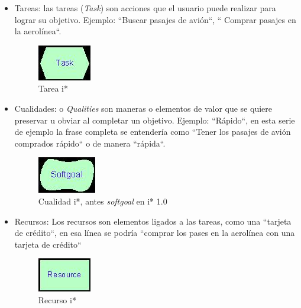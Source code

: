 \begin{itemize}
        \item Tareas: las tareas (\textit{Task}) son acciones que el usuario puede realizar para lograr su objetivo. Ejemplo: ``Buscar pasajes de avión``, `` Comprar pasajes en la aerolínea``.
                \begin{figure}[H]
            \centering
            \includegraphics{media/imagenes/i_star/sintaxis/task.jpg}
            \caption{Tarea \gls{i*}}
        \end{figure}
        \item Cualidades: o \textit{Qualities} son maneras o elementos de valor que se quiere preservar u obviar al completar un objetivo. Ejemplo: ``Rápido``, en esta serie de ejemplo la frase completa se entendería como ``Tener los pasajes de avión comprados rápido`` o de manera ``rápida``.
                \begin{figure}[h]
            \centering
            \includegraphics{media/imagenes/i_star/sintaxis/softgoal.jpg}
            \caption{Cualidad \gls{i*}, antes \textit{softgoal} en i* 1.0}
        \end{figure}
        \item Recursos: Los recursos son elementos ligados a las tareas, como una ``tarjeta de crédito``, en esa línea se podría ``comprar los pases en la aerolínea con una tarjeta de crédito``
                \begin{figure}[h]
            \centering
            \includegraphics{media/imagenes/i_star/sintaxis/resource.jpg}
            \caption{Recurso \gls{i*}}
        \end{figure}
        

\end{itemize}
